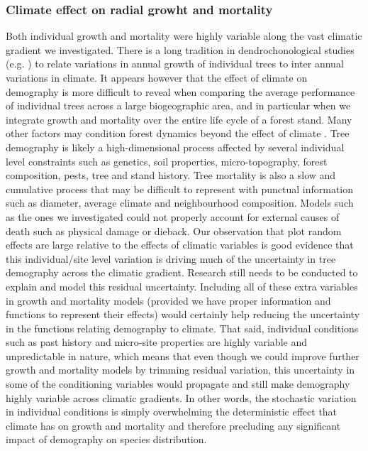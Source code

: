 \subsubsection{Climate effect on radial growht and mortality}
Both individual growth and mortality were highly variable along the vast climatic gradient we investigated. There is a long tradition in dendrochonological studies (e.g. \citet{Aussenac2017}) to relate variations in annual growth of individual trees to inter annual variations in climate. It appears however that the effect of climate on demography is more difficult to reveal when comparing the average performance of individual trees across a large biogeographic area, and in particular when we integrate growth and mortality over the entire life cycle of a forest stand. Many other factors may condition forest dynamics beyond the effect of climate \citep{Zhang2015}. Tree demography is likely a high-dimensional process \citep{Clark2011} affected by several individual level constraints such as genetics, soil properties, micro-topography, forest composition, pests, tree and stand history. Tree mortality is also a slow and cumulative process that may be difficult to represent with punctual information such as diameter, average climate and neighbourhood composition. Models such as the ones we investigated could not properly account for external causes of death such as physical damage \citep[uprooting, stem breakage, crushing by other falling trees]{Larson2010} or dieback. Our observation that plot random effects are large relative to the effects of climatic variables is good evidence that this individual/site level variation is driving much of the uncertainty in tree demography across the climatic gradient. Research still needs to be conducted to explain and model this residual uncertainty. Including all of these extra variables in growth and mortality models (provided we have proper information and functions to represent their effects) would certainly help reducing the uncertainty in the functions relating demography to climate. That said, individual conditions such as past history and micro-site properties are highly variable and unpredictable in nature, which means that even though we could improve further growth and mortality models by trimming residual variation, this uncertainty in some of the conditioning variables would propagate and still make demography highly variable across climatic gradients. In other words, the stochastic variation in individual conditions is simply overwhelming the deterministic effect that climate has on growth and mortality and therefore precluding any significant impact of demography on species distribution.

